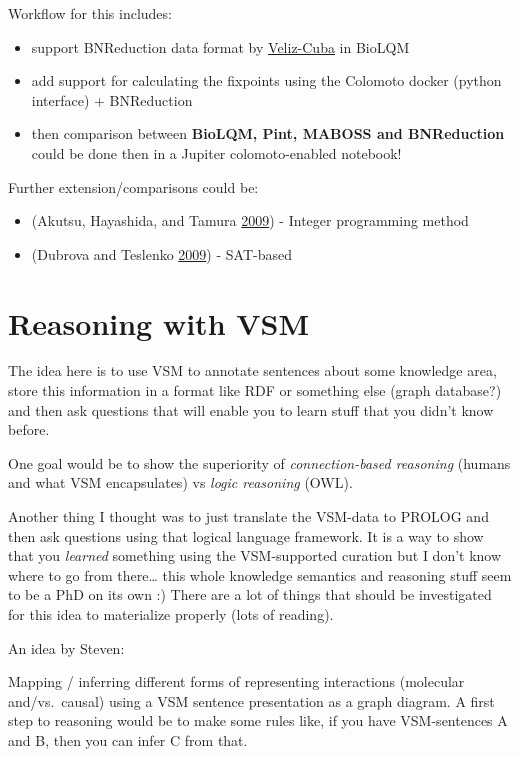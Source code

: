 \documentclass[
  12pt,
]{book}
\providecommand{\tightlist}{%
  \setlength{\itemsep}{0pt}\setlength{\parskip}{0pt}}
\begin{document}
Workflow for this includes:

\begin{itemize}
\tightlist
\item
  support BNReduction data format by \href{https://doi.org/10.1186/1471-2105-15-221}{Veliz-Cuba}
  in BioLQM
\item
  add support for calculating the fixpoints using the Colomoto docker (python
  interface) + BNReduction
\item
  then comparison between \textbf{BioLQM, Pint, MABOSS and BNReduction} could be done then
  in a Jupiter colomoto-enabled notebook!
\end{itemize}

Further extension/comparisons could be:

\begin{itemize}
\tightlist
\item
  (Akutsu, Hayashida, and Tamura \protect\hyperlink{ref-Akutsu2009}{2009}) - Integer programming method
\item
  (Dubrova and Teslenko \protect\hyperlink{ref-Dubrova2009}{2009}) - SAT-based
\end{itemize}

\hypertarget{reasoning-with-vsm}{%
\section{Reasoning with VSM}\label{reasoning-with-vsm}}

The idea here is to use VSM to annotate sentences about some knowledge area,
store this information in a format like RDF or something else (graph database?)
and then ask questions that will enable you to learn stuff that you didn't know
before.

One goal would be to show the superiority of \emph{connection-based reasoning}
(humans and what VSM encapsulates) vs \emph{logic reasoning} (OWL).

Another thing I thought was to just translate the VSM-data to PROLOG
and then ask questions using that logical language framework. It is a way to show
that you \emph{learned} something using the VSM-supported curation but I don't know
where to go from there\ldots{} this whole knowledge semantics and reasoning stuff
seem to be a PhD on its own :) There are a lot of things that should
be investigated for this idea to materialize properly (lots of reading).

An idea by Steven:

Mapping / inferring different forms of representing interactions (molecular
and/vs.~causal) using a VSM sentence presentation as a graph diagram. A first
step to reasoning would be to make some rules like, if you have VSM-sentences
A and B, then you can infer C from that.
\end{document}
